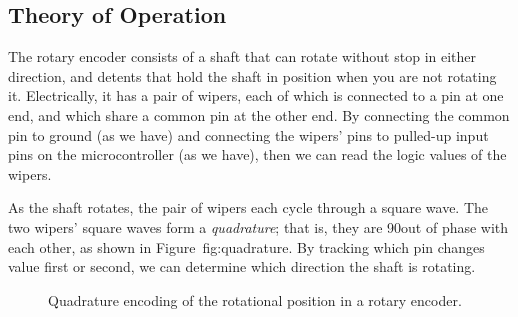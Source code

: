 \subsection{Theory of Operation}

The rotary encoder consists of a shaft that can rotate without stop in either direction,
and detents that hold the shaft in position when you are not rotating it.
Electrically, it has a pair of wipers, each of which is connected to a pin at one end, and which share a common pin at the other end.
By connecting the common pin to ground (as we have) and connecting the wipers' pins to pulled-up input pins on the microcontroller (as we have), then we can read the logic values of the wipers.

As the shaft rotates, the pair of wipers each cycle through a square wave.
The two wipers' square waves form a \textit{quadrature};
that is, they are 90\textdegree out of phase with each other, as shown in Figure~{fig:quadrature}.
By tracking which pin changes value first or second, we can determine which direction the shaft is rotating.

\begin{figure}
    \begin{center}
        \caption{Quadrature encoding of the rotational position in a rotary encoder.} \label{fig:quadrature}
    \end{center}
\end{figure}

